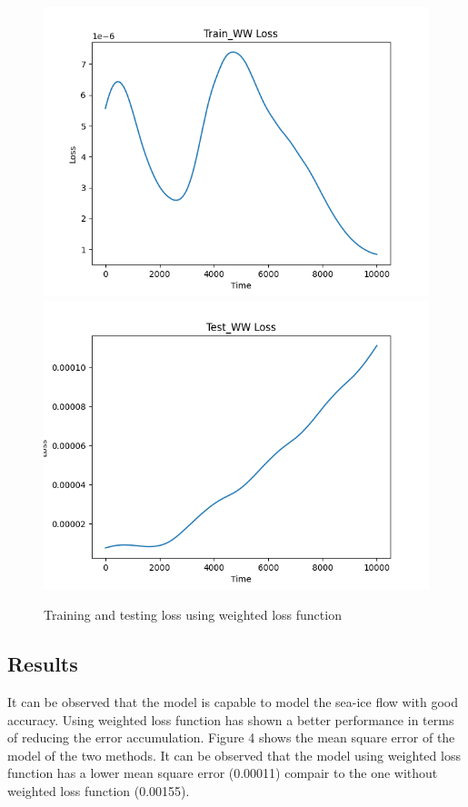 \documentclass[12pt, a4paper]{article}
\begin{document}
\begin{figure}
    \centering
    \includegraphics[scale=0.4]{../Train_WW_loss.png}
    \includegraphics[scale=0.4]{../Test_WW_loss.png}
    \caption[]{Training and testing loss using weighted loss function}
    \label{fig:loss_ww}
\end{figure}

\subsection{Results}
It can be observed that the model is capable to model the sea-ice flow with good accuracy. Using weighted loss function has shown a better performance in terms of reducing the error accumulation. Figure 4 shows the mean square error of the model of the two methods. It can be observed that the model using weighted loss function has a lower mean square error (0.00011) compair to the one without weighted loss function (0.00155).
\end{document}

